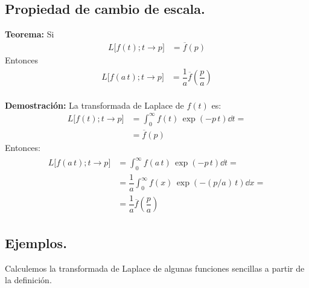 \subsection{Propiedad de cambio de escala.}

\noindent \textbf{Teorema: } Si
\begin{align*}
L \big[f(t); t \to p\big] &= \overline{f} (p)
\end{align*}
Entonces
\begin{align*}
L \big[f(a \, t); t \to p\big] &= \dfrac{1}{a}\overline{f} \left(\dfrac{p}{a}\right)
\end{align*}
\\[0.5em]
\textbf{Demostración: } La transformada de Laplace de $f(t)$ es:
\begin{align*}
L \big[f(t); t \to p\big] &= \int_{0}^{\infty} f(t) \, \exp(-p \, t) \dd{t} = \\[0.5em]
&= \overline{f} (p)
\end{align*}
Entonces:
\begin{align}
\begin{aligned}
L \big[f(a \, t); t \to p\big] &= \int_{0}^{\infty} f(a \, t) \, \exp(-p \, t) \dd{t} = \\[0.5em]
&= \dfrac{1}{a} \int_{0}^{\infty} f(x) \, \exp(- (p/a) \, t) \dd{x} = \\[0.5em]
&= \dfrac{1}{a}\overline{f} \left(\dfrac{p}{a}\right)
\end{aligned}
\label{eq:ecuacion_03_09}
\end{align}

\subsection*{Ejemplos.}

Calculemos la transformada de Laplace de algunas funciones sencillas a partir de la definición.

